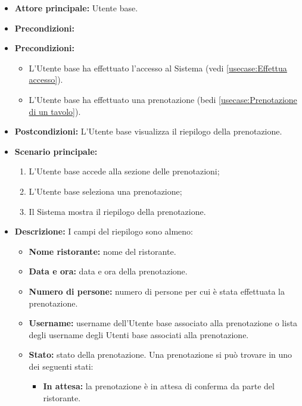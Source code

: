 \label{usecase:Visualizzazione del riepilogo prenotazione}
\begin{itemize}
	\item \textbf{Attore principale:} Utente base.

	\item \textbf{Precondizioni:}
	\item \textbf{Precondizioni:}
	\begin{itemize}
		\item L'Utente base ha effettuato l'accesso al Sistema (vedi \autoref{usecase:Effettua accesso}).
		\item L'Utente base ha effettuato una prenotazione (bedi \autoref{usecase:Prenotazione di un tavolo}).
	\end{itemize}


	\item \textbf{Postcondizioni:}
	      L'Utente base visualizza il riepilogo della prenotazione.

	\item \textbf{Scenario principale:}
	      \begin{enumerate}
		      \item L'Utente base accede alla sezione delle prenotazioni;
		      \item L'Utente base seleziona una prenotazione;
		      \item Il Sistema mostra il riepilogo della prenotazione.
	      \end{enumerate}

	\item \textbf{Descrizione:}
	      I campi del riepilogo sono almeno:
	      \begin{itemize}
		      \item \textbf{Nome ristorante:} nome del ristorante.
		      \item \textbf{Data e ora:} data e ora della prenotazione.
		      \item \textbf{Numero di persone:} numero di persone per cui è
		            stata effettuata la prenotazione.
		      \item \textbf{Username:} username dell'Utente base
		            associato alla prenotazione o lista degli username degli
		            Utenti base associati alla prenotazione.

		      \item \textbf{Stato:} stato della prenotazione. Una
		            prenotazione si può trovare in uno dei seguenti stati:
		            \begin{itemize}
			            \item \textbf{In attesa:} la prenotazione è
			                  in attesa di conferma da parte del ristorante.


\end{itemize}
\end{itemize}
\end{itemize}
